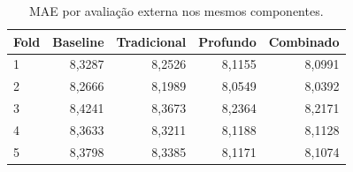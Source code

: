 \begin{table}[htbp]
\centering\small
\caption{MAE por avaliação externa nos mesmos componentes.}
\label{tab:folds}
\begin{tabular}{lrrrr}
\toprule
Fold & Baseline & Tradicional & Profundo & Combinado \\
\midrule
1 & 8,3287 & 8,2526 & 8,1155 & 8,0991 \\
2 & 8,2666 & 8,1989 & 8,0549 & 8,0392 \\
3 & 8,4241 & 8,3673 & 8,2364 & 8,2171 \\
4 & 8,3633 & 8,3211 & 8,1188 & 8,1128 \\
5 & 8,3798 & 8,3385 & 8,1171 & 8,1074 \\
\bottomrule
\end{tabular}
\end{table}
